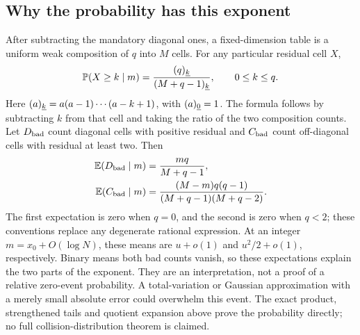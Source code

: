 \subsection{Why the probability has this exponent}
After subtracting the mandatory diagonal ones, a fixed-dimension table is a uniform weak composition of $q$ into $M$ cells. For any particular residual cell $X$,
\begin{equation}\label{pdt:eq:celltail}
 \mathbb P(X\ge k\mid m)=\frac{(q)_{\underline{k}}}{(M+q-1)_{\underline{k}}},\qquad 0\le k\le q.
\end{equation}
Here $(a)_{\underline{k}}=a(a-1)\cdots(a-k+1)$, with $(a)_{\underline{0}}=1$. The formula follows by subtracting $k$ from that cell and taking the ratio of the two composition counts. Let $D_{\rm bad}$ count diagonal cells with positive residual and $C_{\rm bad}$ count off-diagonal cells with residual at least two. Then
\begin{align}
 \mathbb E(D_{\rm bad}\mid m)&=\frac{mq}{M+q-1},\label{pdt:eq:bad-diag}\\
 \mathbb E(C_{\rm bad}\mid m)&=\frac{(M-m)q(q-1)}{(M+q-1)(M+q-2)}.\label{pdt:eq:bad-coll}
\end{align}
The first expectation is zero when $q=0$, and the second is zero when $q<2$; these conventions replace any degenerate rational expression. At an integer $m=x_0+O(\log N)$, these means are $u+o(1)$ and $u^2/2+o(1)$, respectively. Binary means both bad counts vanish, so these expectations explain the two parts of the exponent. They are an interpretation, not a proof of a relative zero-event probability. A total-variation or Gaussian approximation with a merely small absolute error could overwhelm this event. The exact product, strengthened tails and quotient expansion above prove the probability directly; no full collision-distribution theorem is claimed.

